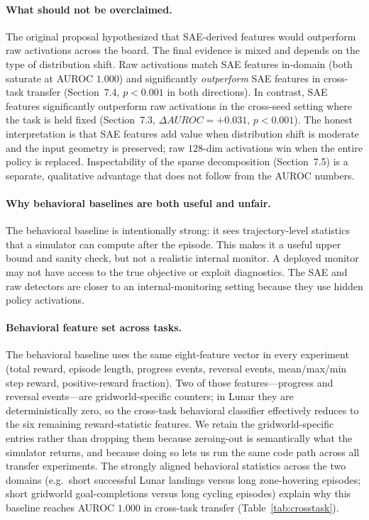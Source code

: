 \documentclass[11pt]{article}
\newcommand{\auroc}{AUROC}
\begin{document}
\paragraph{What should not be overclaimed.}
The original proposal hypothesized that SAE-derived features would outperform raw activations across the board. The final evidence is mixed and depends on the type of distribution shift. Raw activations match SAE features in-domain (both saturate at AUROC $1.000$) and significantly \emph{outperform} SAE features in cross-task transfer (Section~7.4, $p<0.001$ in both directions). In contrast, SAE features significantly outperform raw activations in the cross-seed setting where the task is held fixed (Section~7.3, $\Delta\auroc{}=+0.031$, $p<0.001$). The honest interpretation is that SAE features add value when distribution shift is moderate and the input geometry is preserved; raw $128$-dim activations win when the entire policy is replaced. Inspectability of the sparse decomposition (Section~7.5) is a separate, qualitative advantage that does not follow from the AUROC numbers.

\paragraph{Why behavioral baselines are both useful and unfair.}
The behavioral baseline is intentionally strong: it sees trajectory-level statistics that a simulator can compute after the episode. This makes it a useful upper bound and sanity check, but not a realistic internal monitor. A deployed monitor may not have access to the true objective or exploit diagnostics. The SAE and raw detectors are closer to an internal-monitoring setting because they use hidden policy activations.

\paragraph{Behavioral feature set across tasks.}
The behavioral baseline uses the same eight-feature vector in every experiment (total reward, episode length, progress events, reversal events, mean/max/min step reward, positive-reward fraction). Two of those features---progress and reversal events---are gridworld-specific counters; in Lunar they are deterministically zero, so the cross-task behavioral classifier effectively reduces to the six remaining reward-statistic features. We retain the gridworld-specific entries rather than dropping them because zeroing-out is semantically what the simulator returns, and because doing so lets us run the same code path across all transfer experiments. The strongly aligned behavioral statistics across the two domains (e.g.\ short successful Lunar landings versus long zone-hovering episodes; short gridworld goal-completions versus long cycling episodes) explain why this baseline reaches \auroc{} $1.000$ in cross-task transfer (Table~\ref{tab:crosstask}).
\end{document}
